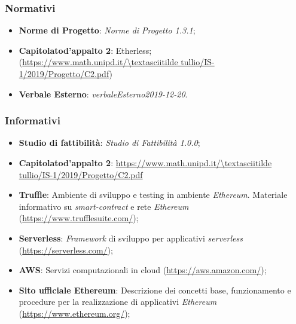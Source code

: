 \subsubsection{Normativi}
	\begin{itemize}
		\item \textbf{Norme di Progetto}: \textit{Norme di Progetto 1.3.1\docs};
		\item \textbf{Capitolato\glo d'appalto 2}: Etherless;\\ 
			(\url{https://www.math.unipd.it/\textasciitilde tullio/IS-1/2019/Progetto/C2.pdf})
		\item \textbf{Verbale Esterno}: \textit{verbaleEsterno2019-12-20\docs}.
	\end{itemize}
\subsubsection{Informativi}
\begin{itemize}
	\item \textbf{Studio di fattibilità}: \textit{Studio di Fattibilità 1.0.0\docs};
    \item \textbf{Capitolato\glo d'appalto 2}: \url{https://www.math.unipd.it/\textasciitilde tullio/IS-1/2019/Progetto/C2.pdf}
	\item \textbf{Truffle}:  Ambiente di sviluppo e testing in ambiente \textit{Ethereum\glos}. Materiale informativo su \textit{smart-contract\glo} e rete \textit{Ethereum\glos} (\url{https://www.trufflesuite.com/});
	\item \textbf{Serverless\glos}:  \textit{Framework\glo} di sviluppo per applicativi \textit{serverless\glos} (\url{https://serverless.com/});
	\item \textbf{AWS}: Servizi computazionali in cloud (\url{https://aws.amazon.com/});
	\item \textbf{Sito ufficiale Ethereum\glos}: Descrizione dei concetti base, funzionamento e procedure per la realizzazione di applicativi \textit{Ethereum\glos} (\url {https://www.ethereum.org/});
\end{itemize}

	
	
	